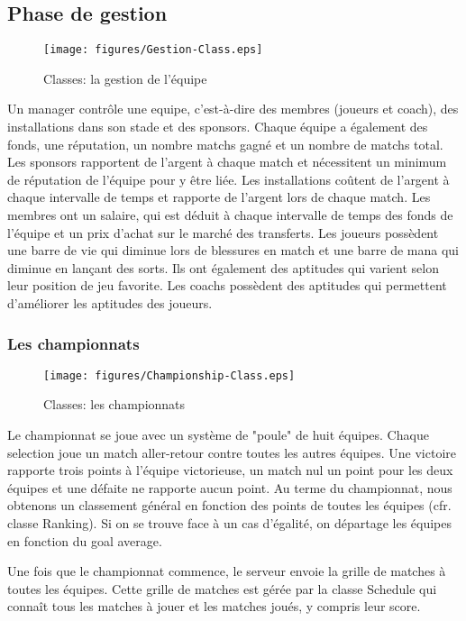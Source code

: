 \subsection{Phase de gestion}
\begin{sidewaysfigure}
  \centering
  \texttt{[image: figures/Gestion-Class.eps]}
  \caption{\label{fig:Class:Management} Classes: la gestion de l'équipe}
\end{sidewaysfigure}

Un \gls{manager} contrôle une \gls{equipe}, c'est-à-dire des \gls{membre}s 
(\gls{joueur}s et 
\gls{coach}), des \gls{installation}s dans son \gls{stade} et des 
\gls{sponsor}s. Chaque équipe a également des 
fonds, une réputation, un nombre matchs gagné et un nombre de matchs total.
Les sponsors rapportent de l'argent à chaque match et nécessitent un minimum 
de réputation de l'équipe pour y être liée. Les installations coûtent 
de l'argent à chaque intervalle de temps et rapporte de l'argent lors de 
chaque match.
Les membres ont un salaire, qui est déduit à chaque intervalle de temps des 
fonds de l'équipe et un prix d'achat sur le marché des transferts.
Les joueurs possèdent une barre de vie qui diminue lors de blessures en match 
et une barre de mana qui diminue en lançant des sorts. Ils ont également des 
aptitudes qui varient selon leur position de jeu favorite.
Les coachs possèdent des aptitudes qui permettent d'améliorer les aptitudes 
des joueurs.

\subsubsection{Les championnats}
\begin{figure}[h!]
  \centering
  \texttt{[image: figures/Championship-Class.eps]}
  \caption{\label{fig:Class:Championship} Classes: les championnats}
\end{figure}
Le championnat se joue avec un système de "poule" de huit équipes. Chaque 
\gls{selection} joue un 
match aller-retour contre toutes les autres équipes. Une victoire rapporte 
trois 
points à l'équipe victorieuse, un match nul un point pour les deux équipes et une défaite 
ne rapporte aucun point. Au terme du championnat, nous obtenons un classement général
en fonction des points de toutes les équipes (cfr. classe Ranking). Si on se trouve face
à un cas d'égalité, on départage les équipes en fonction du goal average. 


Une fois que le championnat commence, le serveur envoie la grille de matches à toutes 
les équipes. Cette grille de matches est gérée par la classe Schedule qui connaît tous les
matches à jouer et les matches joués, y compris leur score.




